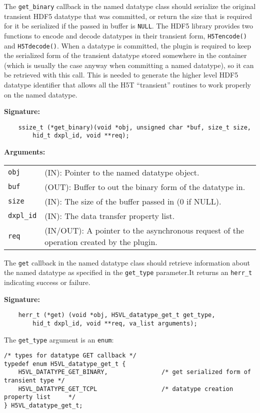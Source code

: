 The {\tt get\_binary} callback in the named datatype class should
serialize the original transient HDF5 datatype that was committed, or
return the size that is required for it be serialized if the passed in
buffer is {\tt NULL}. The HDF5 library provides two functions to
encode and decode datatypes in their transient form, {\tt H5Tencode()}
and {\tt H5Tdecode()}. When a datatype is committed, the plugin is
required to keep the serialized form of the transient datatype stored
somewhere in the container (which is usually the case anyway when
committing a named datatype), so it can be retrieved with this
call. This is needed to generate the higher level HDF5 datatype
identifier that allows all the H5T ``transient'' routines to work
properly on the named datatype.

\textbf{Signature:}
\begin{lstlisting}
    ssize_t (*get_binary)(void *obj, unsigned char *buf, size_t size, 
        hid_t dxpl_id, void **req);
\end{lstlisting}

\textbf{Arguments:}\\
\begin{tabular}{l p{10cm}}
  {\tt obj} & (IN): Pointer to the named datatype object.\\
  {\tt buf} & (OUT): Buffer to out the binary form of the datatype in.\\
  {\tt size} & (IN): The size of the buffer passed in (0 if NULL).\\
  {\tt dxpl\_id} & (IN): The data transfer property list.\\
  {\tt req} & (IN/OUT): A pointer to the asynchronous request of the
  operation created by the plugin.\\
\end{tabular}

The {\tt get} callback in the named datatype class should retrieve
information about the named datatype as specified in the {\tt get\_type}
parameter.It returns an {\tt herr\_t} indicating success or failure.

\textbf{Signature:}
\begin{lstlisting}
    herr_t (*get) (void *obj, H5VL_datatype_get_t get_type, 
        hid_t dxpl_id, void **req, va_list arguments);
\end{lstlisting}

The {\tt get\_type} argument is an {\tt enum}:
\begin{lstlisting}
/* types for datatype GET callback */
typedef enum H5VL_datatype_get_t {
    H5VL_DATATYPE_GET_BINARY,               /* get serialized form of transient type */
    H5VL_DATATYPE_GET_TCPL                  /* datatype creation property list     */
} H5VL_datatype_get_t;
\end{lstlisting}

